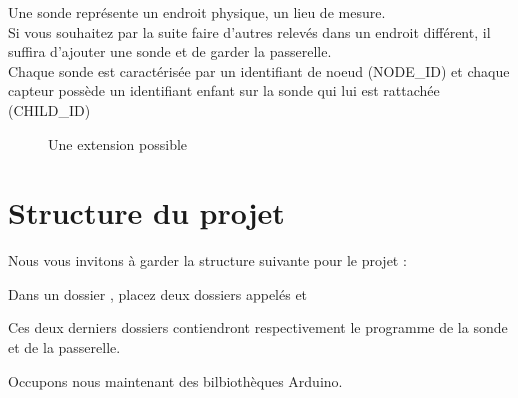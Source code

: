   Une sonde représente un endroit physique, un lieu de mesure. \\
  Si vous souhaitez par la suite faire d'autres relevés dans un endroit différent, il suffira d'ajouter une sonde et de garder la passerelle.\\
  Chaque sonde est caractérisée par un identifiant de noeud (NODE\_ID) et chaque capteur possède un identifiant enfant sur la sonde qui lui est rattachée (CHILD\_ID)
  \begin{figure}[h]
    \centering
    \caption{Une extension possible}
  \end{figure}





  \section{Structure du projet}

  Nous vous invitons à garder la structure suivante pour le projet : 
  
  Dans un dossier , placez deux dossiers appelés  et\\ 
  
  Ces deux derniers dossiers contiendront respectivement le programme de la sonde et de la passerelle.
  
  
  
  

  Occupons nous maintenant des bilbiothèques Arduino.